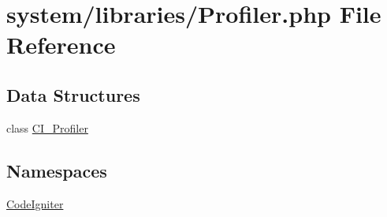 \hypertarget{system_2libraries_2profiler_8php}{\section{system/libraries/\-Profiler.php File Reference}
\label{system_2libraries_2profiler_8php}
}
\subsection*{Data Structures}
\begin{DoxyCompactItemize}
\item 
class \hyperlink{class_c_i___profiler}{C\-I\-\_\-\-Profiler}
\end{DoxyCompactItemize}
\subsection*{Namespaces}
\begin{DoxyCompactItemize}
\item 
\hyperlink{namespace_code_igniter}{Code\-Igniter}
\end{DoxyCompactItemize}
